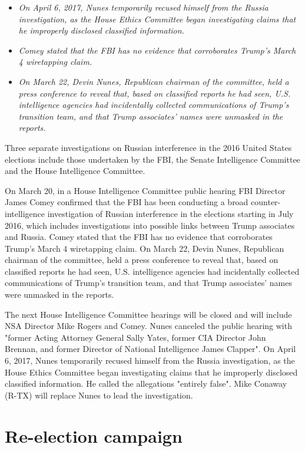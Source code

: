 \begin{itemize}
\item
  \emph{On April 6, 2017, Nunes temporarily recused himself from the
  Russia investigation, as the House Ethics Committee began
  investigating claims that he improperly disclosed classified
  information.}
\item
  \emph{Comey stated that the FBI has no evidence that corroborates
  Trump's March 4 wiretapping claim.}
\item
  \emph{On March 22, Devin Nunes, Republican chairman of the committee,
  held a press conference to reveal that, based on classified reports he
  had seen, U.S. intelligence agencies had incidentally collected
  communications of Trump's transition team, and that Trump associates'
  names were unmasked in the reports.}
\end{itemize}

Three separate investigations on Russian interference in the 2016 United
States elections include those undertaken by the FBI, the Senate
Intelligence Committee and the House Intelligence Committee.

On March 20, in a House Intelligence Committee public hearing FBI
Director James Comey confirmed that the FBI has been conducting a broad
counter-intelligence investigation of Russian interference in the
elections starting in July 2016, which includes investigations into
possible links between Trump associates and Russia. Comey stated that
the FBI has no evidence that corroborates Trump's March 4 wiretapping
claim. On March 22, Devin Nunes, Republican chairman of the committee,
held a press conference to reveal that, based on classified reports he
had seen, U.S. intelligence agencies had incidentally collected
communications of Trump's transition team, and that Trump associates'
names were unmasked in the reports.

The next House Intelligence Committee hearings will be closed and will
include NSA Director Mike Rogers and Comey. Nunes canceled the public
hearing with "former Acting Attorney General Sally Yates, former CIA
Director John Brennan, and former Director of National Intelligence
James Clapper". On April 6, 2017, Nunes temporarily recused himself from
the Russia investigation, as the House Ethics Committee began
investigating claims that he improperly disclosed classified
information. He called the allegations "entirely false". Mike Conaway
(R-TX) will replace Nunes to lead the investigation.

\section{Re-election campaign}\label{re-election-campaign}

